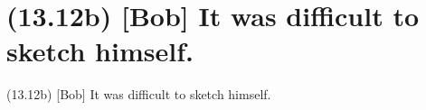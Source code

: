 \documentclass{article}
\begin{document}
\clearpage

%
%

\section*{(13.12b) [Bob] It was difficult to sketch himself.}

\bigbreak
\begin{enumerate*}
\item[(13.12b)] [Bob] It was difficult to sketch himself.
\end{enumerate*}
\bigbreak
\end{document}
